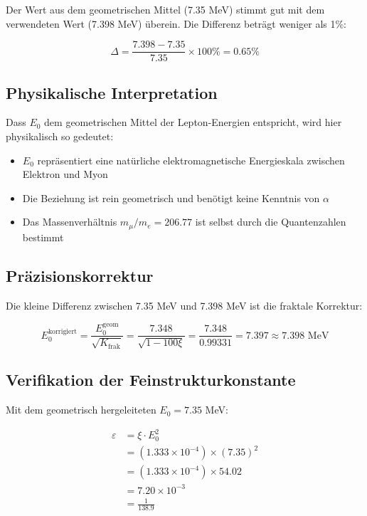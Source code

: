 	Der Wert aus dem geometrischen Mittel (7.35 MeV) stimmt gut mit dem verwendeten Wert (7.398 MeV) überein. Die Differenz beträgt weniger als 1\%:
	
	\begin{equation}
		\Delta = \frac{7.398 - 7.35}{7.35} \times 100\% = 0.65\%
	\end{equation}
	
	\subsection{Physikalische Interpretation}
	
	Dass $E_0$ dem geometrischen Mittel der Lepton-Energien entspricht, wird hier physikalisch so gedeutet:
	
	\begin{itemize}
		\item $E_0$ repräsentiert eine natürliche elektromagnetische Energieskala zwischen Elektron und Myon
		\item Die Beziehung ist rein geometrisch und benötigt keine Kenntnis von $\alpha$
		\item Das Massenverhältnis $m_\mu/m_e = 206.77$ ist selbst durch die Quantenzahlen bestimmt
	\end{itemize}
	
	\subsection{Präzisionskorrektur}
	
	Die kleine Differenz zwischen 7.35 MeV und 7.398 MeV ist die fraktale Korrektur:
	
	\begin{equation}
		E_0^{\text{korrigiert}} = \frac{E_0^{\text{geom}}}{\sqrt{K_{\text{frak}}}} = \frac{7.348}{\sqrt{1 - 100\xi}} = \frac{7.348}{0.99331} = 7.397 \approx 7.398 \text{ MeV}
	\end{equation}
	
	\subsection{Verifikation der Feinstrukturkonstante}
	
	Mit dem geometrisch hergeleiteten $E_0 = 7.35$ MeV:
	
	\begin{align}
		\varepsilon &= \xi \cdot E_0^2\\
		&= (1.333 \times 10^{-4}) \times (7.35)^2\\
		&= (1.333 \times 10^{-4}) \times 54.02\\
		&= 7.20 \times 10^{-3}\\
		&= \frac{1}{138.9}
	\end{align}
	
